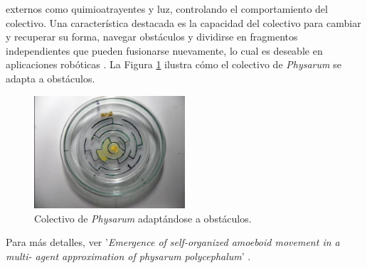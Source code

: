         externos como quimioatrayentes y luz, controlando el comportamiento del colectivo.
    \vskip 0.5cm
    Una caracter\'istica destacada es la capacidad del colectivo para cambiar y recuperar su forma, navegar obst\'aculos 
        y dividirse en fragmentos independientes que pueden fusionarse nuevamente, lo cual es deseable en aplicaciones 
        rob\'oticas \cite{Adamatzky2010}. La Figura \ref{fig:adaptacion_obstaculos} ilustra c\'omo el colectivo de 
        \textit{Physarum} se adapta a obst\'aculos.
    \vskip 0.5cm
    \begin{figure}[h]
        \centering
        \includegraphics[width=0.5\textwidth]{./images/estado_del_arte/physarum/laberinto.png}
        \caption{Colectivo de \textit{Physarum} adapt\'andose a obst\'aculos. \cite{Adamatzky_2012}}
        \label{fig:adaptacion_obstaculos}
    \end{figure}
    \vskip 0.5cm
    Para m\'as detalles, ver '\textit{Emergence of self-organized amoeboid movement in a multi-
    agent approximation of physarum polycephalum}' \cite{jones2012}.
